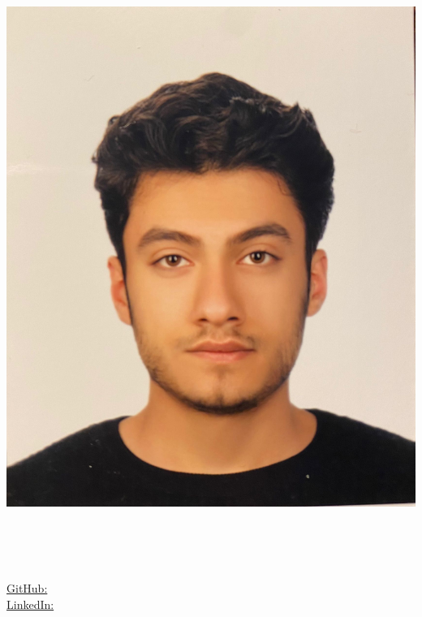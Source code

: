 \begin{center}
	\begin{minipage}[b]{.2\textwidth}
	\raggedright	
        \graphicspath{ {./images/} }
        \includegraphics[scale=0.04]{photo.jpeg} \\
	\end{minipage}%
	\begin{minipage}[b]{.6\textwidth}
	\makeatletter
	\centering {\Huge \@author} \\
	\makeatother
    \vspace{3em}
	\end{minipage}%
        \begin{minipage}[b]{.2\textwidth}
	\raggedleft
	{\large \phone} \\ %
	{\city} \\ %
	\href{mailto:\email}{\email} %
	\raggedleft
	\href{https://github.com/\github}{GitHub: \github} \\%
	\href{https://www.linkedin.com/in/\LinkedIn}{LinkedIn: \LinkedIn} \\%
	\end{minipage}

\end{center}